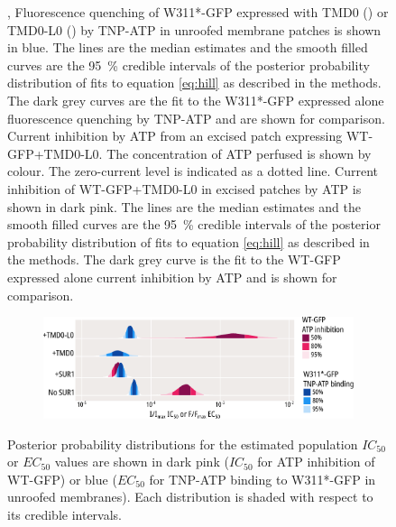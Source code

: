 \begin{figure}[hbtp]
\begin{subfigure}[t]{0.35\textwidth}
	\end{subfigure}
	\caption[TMD0 and TMD0-LO subtly alter TNP-ATP binding to Kir6.2]{
	{\bf{}}
	,  Fluorescence quenching of W311*-GFP expressed with TMD0 () or TMD0-L0 () by TNP-ATP in unroofed membrane patches is shown in blue.
	The lines are the median estimates and the smooth filled curves are the \SI{95}{\percent} credible intervals of the posterior probability distribution of fits to equation \ref{eq:hill} as described in the methods.
	The dark grey curves are the fit to the W311*-GFP expressed alone fluorescence quenching by TNP-ATP and are shown for comparison.
	 Current inhibition by ATP from an excised patch expressing WT-GFP+TMD0-L0.
	The concentration of ATP perfused is shown by colour.
	The zero-current level is indicated as a dotted line.
	 Current inhibition of WT-GFP+TMD0-L0 in excised patches by ATP is shown in dark pink.
	The lines are the median estimates and the smooth filled curves are the \SI{95}{\percent} credible intervals of the posterior probability distribution of fits to equation \ref{eq:hill} as described in the methods.
	The dark grey curve is the fit to the WT-GFP expressed alone current inhibition by ATP and is shown for comparison.
	}\label{ch6fig:tmd0_binding}
\end{figure}

\begin{figure}[hbtp]
	\centering
	\begin{subfigure}[t]{0.9\textwidth}
		\caption{}\label{ch6fig:tmd0s_ec50s}
		\centering
		\includegraphics[width=\textwidth]{tmd0s_ec50s.pdf}
	\end{subfigure}
	\caption[TMD0 and TMD0-LO subtly alter the effect of nucleotides on Kir6.2]{
	{\bf{}}
	 Posterior probability distributions for the estimated population $IC_{50}$ or $EC_{50}$ values are shown in dark pink ($IC_{50}$ for ATP inhibition of WT-GFP) or blue ($EC_{50}$ for TNP-ATP binding to W311*-GFP in unroofed membranes).
	Each distribution is shaded with respect to its credible intervals.
	}\label{ch6fig:tmd0_binding_2}
\end{figure}

